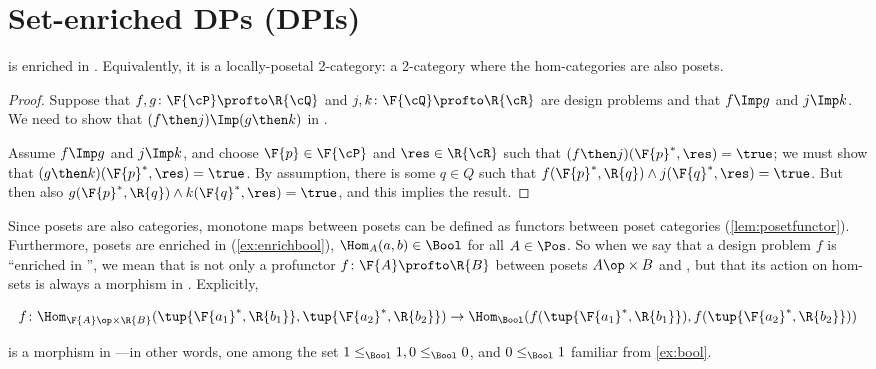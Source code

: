 

\section{Set-enriched DPs (DPIs)}

\begin{proposition}
    \label{prop:DP_loc_pos}
    \DP is enriched in \Pos. Equivalently, it is a locally-posetal 2-category: a 2-category where the hom-categories are also posets.
\end{proposition}
\begin{proof}
    Suppose that $f,g\colon \F{\cP} \profto \R{\cQ}$ and $j,k\colon \F{\cQ} \profto \R{\cR}$ are design problems and that $f\Imp g$ and $j\Imp k$. We need to show that $(f\then j)\Imp(g\then k)$ in \DP.
    \begin{center}
    \end{center}
    Assume $f\Imp g$ and $j\Imp k$, and choose $\F{p}\in\F{\cP} $ and $\res\in\R{\cR}$ such that $(f\then j)(\F{p}^*,\res)=\true$; we must show that $(g \then k)(\F{p}^*,\res)=\true$. By assumption, there is some $q\in Q$ such that $f(\F{p}^*,\R{q})\wedge j(\F{q}^*,\res)=\true$. But then also $g(\F{p}^*,\R{q})\wedge k(\F{q}^*,\res)=\true$, and this implies the result.
\end{proof}

Since posets are also categories, monotone maps between posets can be defined as functors between poset categories (\cref{lem:posetfunctor}). Furthermore, posets are enriched in \Bool (\cref{ex:enrichbool}), \ie  $\Hom_A(a,b) \in \Bool$ for all $A \in \Pos$. So when we say that a design problem $f$ is ``enriched in \Bool'', we mean that is not only a profunctor $f \colon \F{A} \profto \R{B}$ between posets $A\op \times B$ and \Bool, but that its action on hom-sets is always a morphism in \Bool. Explicitly,
\begin{widepar}
    \begin{equation*}
        f \colon \Hom_{\F{A}\op \times \R{B}}(\tup{\F{a_1}^*,\R{b_1}}, \tup{\F{a_2}^*,\R{b_2}}) \to \Hom_\Bool(f(\tup{\F{a_1}^*,\R{b_1}}), f(\tup{\F{a_2}^*,\R{b_2}}))
    \end{equation*}
\end{widepar}
is a morphism in \Bool---in other words, one among the set $1 \leq_\Bool 1, 0 \leq_\Bool 0$, and $0 \leq_\Bool 1$ familiar from \cref{ex:bool}.


